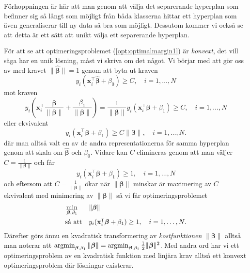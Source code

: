 \documentclass[a4paper, 12pt]{report}
\theoremstyle{definition}
\theoremstyle{remark}
\newcommand{\bfbeta}{{\boldsymbol{\beta}}}
\begin{document}
Förhoppningen är här att man genom att välja det separerande hyperplan som befinner sig så långt som möjligt från båda klasserna hittar ett hyperplan som även generaliserar till ny data så bra som möjligt. Dessutom kommer vi också se att detta är ett sätt att unikt välja ett separerande hyperplan.

För att se att optimeringsproblemet (\ref{opt:optimalmargin1}) är \textit{konvext}, det vill säga har en unik lösning, måst vi skriva om det något. Vi börjar med att gör oss av med kravet $\|\widehat{\bfbeta}\|=1$ genom att byta ut kraven
\begin{equation*}
y_i(\mathbf{x}_i^\intercal\widehat{\bfbeta}+\beta_0)\geq C,\quad i=1,\dots,N
\end{equation*}
mot kraven
\begin{equation*}
y_i(\mathbf{x}_i^\intercal\frac{\bfbeta}{\|\bfbeta\|}+\frac{\beta_1}{\|\bfbeta\|}) = 
\frac{1}{\|\bfbeta\|}y_i(\mathbf{x}_i^\intercal\bfbeta+\beta_1)
 \geq C,\quad i=1,\dots,N
\end{equation*}
eller ekvivalent
\begin{equation*}
y_i(\mathbf{x}_i^\intercal\bfbeta+\beta_1)\geq C\|\bfbeta\|,\quad i=1,\dots,N.
\end{equation*}
där man alltså valt en av de andra representationerna för samma hyperplan genom att skala om $\widehat{\bfbeta}$ och $\beta_0$. Vidare kan $C$ elimineras genom att man väljer $C=\frac{1}{\|\bfbeta\|}$ och får
\begin{equation*}
y_i(\mathbf{x}_i^\intercal\bfbeta+\beta_1)\geq 1,\quad i=1,\dots,N
\end{equation*}
och eftersom att $C=\frac{1}{\|\bfbeta\|}$ ökar när $\|\bfbeta\|$ minskar är maximering av $C$ ekvivalent med minimering av $\|\bfbeta\|$ så vi får optimeringsproblemet
\begin{equation*}%
\begin{aligned}
& \operatornamewithlimits{min}_{\bfbeta,\beta_1} & & \|\bfbeta\|\\
& \text{så att} & & y_i(\mathbf{x}_i^\intercal\bfbeta+\beta_1)\geq 1,\quad i=1,\dots,N.
\end{aligned}
\end{equation*}
Därefter görs ännu en kvadratisk transformering av \textit{kostfunktionen} $\|\bfbeta\|$ alltså man noterar att $\operatornamewithlimits{argmin}_{\bfbeta,\beta_1} \|\bfbeta\|=\operatornamewithlimits{argmin}_{\bfbeta,\beta_1} \frac{1}{2}\|\bfbeta\|^2$. Med andra ord har vi ett optimeringsproblem av en kvadratisk funktion med linjära krav alltså ett konvext optimeringsproblem där lösningar existerar.
\end{document}
